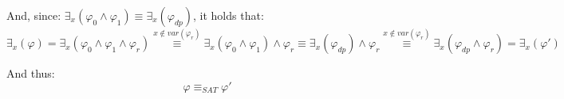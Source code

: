 \documentclass[a4paper,12pt]{article} %
\begin{document}
And, since: $\exists_x(\varphi_0 \wedge \varphi_1) \equiv \exists_x(\varphi_{dp})$, it holds that: $\exists_x(\varphi) = \exists_x(\varphi_0 \wedge \varphi_1 \wedge \varphi_r) \overset{x \not\in var(\varphi_r)}{\equiv} \exists_x(\varphi_0 \wedge \varphi_1) \wedge \varphi_r \equiv \exists_x (\varphi_{dp}) \wedge \varphi_r \overset{x \not\in var(\varphi_r)}{\equiv} \exists_x (\varphi_{dp} \wedge \varphi_r) = \exists_x (\varphi')$

And thus: $$\varphi \equiv_{SAT} \varphi'$$
\end{document}
